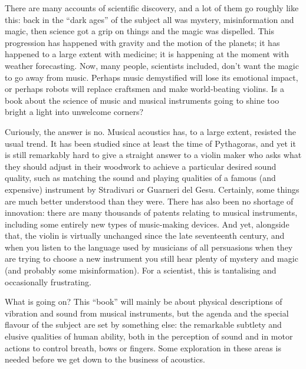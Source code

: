   There are many accounts of scientific discovery, and a lot of them go roughly 
  like this: back in the ``dark ages'' of the subject all was mystery, 
  misinformation and magic, then science got a grip on things and the magic was 
  dispelled. This progression has happened with gravity and the motion of the 
  planets; it has happened to a large extent with medicine; it is happening at 
  the moment with weather forecasting. Now, many people, scientists included, 
  don't want the magic to go away from music. Perhaps music demystified will 
  lose its emotional impact, or perhaps robots will replace craftsmen and make 
  world-beating violins. Is a book about the science of music and musical 
  instruments going to shine too bright a light into unwelcome corners? 

  Curiously, the answer is no. Musical acoustics has, to a large extent, 
  resisted the usual trend. It has been studied since at least the time of 
  Pythagoras, and yet it is still remarkably hard to give a straight answer to 
  a violin maker who asks what they should adjust in their woodwork to achieve 
  a particular desired sound quality, such as matching the sound and playing 
  qualities of a famous (and expensive) instrument by Stradivari or Guarneri 
  del Gesu. Certainly, some things are much better understood than they were. 
  There has also been no shortage of innovation: there are many thousands of 
  patents relating to musical instruments, including some entirely new types of 
  music-making devices. And yet, alongside that, the violin is virtually 
  unchanged since the late seventeenth century, and when you listen to the 
  language used by musicians of all persuasions when they are trying to choose 
  a new instrument you still hear plenty of mystery and magic (and probably 
  some misinformation). For a scientist, this is tantalising and occasionally 
  frustrating. 

  What is going on? This ``book'' will mainly be about physical descriptions of 
  vibration and sound from musical instruments, but the agenda and the special 
  flavour of the subject are set by something else: the remarkable subtlety and 
  elusive qualities of human ability, both in the perception of sound and in 
  motor actions to control breath, bows or fingers. Some exploration in these 
  areas is needed before we get down to the business of acoustics. 

